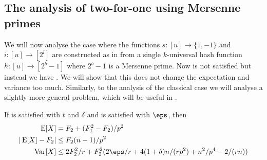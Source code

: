 \subsection{The analysis of two-for-one using Mersenne primes}
We will now analyse the case where the functions $s : [u] \to \{1, -1\}$
and $i : [u] \to [2^l]$ are constructed as in  from a
single $k$-universal hash function $h : [u] \to [2^b - 1]$ where $2^b - 1$
is a Mersenne prime. Now  is not satisfied but
instead we have . We will show that this does
not change the expectation and variance too much. Similarly, to the
analysis of the classical case we will analyse a slightly more general
problem, which will be useful in .
\begin{lemma}\label{lem:count-mersenne}
    If  is satisfied with $t$
    and $\delta$ and  is satisfied with
    $\eps$, then
    \begin{align}
        \E[X] &= F_2 + (F_1^2 - F_2)/p^2 \\
        | \E[X] - F_2 | &\le F_2 (n - 1)/p^2 \\
        \Var[X] &\le 2F_2^2/r + F_2^2 (2\eps/r + 4(1 + \delta)n / (rp^2) + n^2/p^4 - 2 /(rn))
    \end{align}
\end{lemma}
